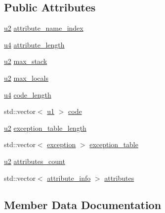 \subsection*{Public Attributes}
\begin{DoxyCompactItemize}
\item 
\hyperlink{types_8h_ae676e9207f57fb921dca7366b2f59c53}{u2} \hyperlink{structCode__attribute_ad268ff5454f5b4cf9d6e158f28a00e3f}{attribute\+\_\+name\+\_\+index}
\item 
\hyperlink{types_8h_af3b2d4b29fd9faedc984db3e062b3d5d}{u4} \hyperlink{structCode__attribute_a30b8294635789d4c5cd087670be6cee9}{attribute\+\_\+length}
\item 
\hyperlink{types_8h_ae676e9207f57fb921dca7366b2f59c53}{u2} \hyperlink{structCode__attribute_a300885ff1326f01f7c86e7b4425f0d35}{max\+\_\+stack}
\item 
\hyperlink{types_8h_ae676e9207f57fb921dca7366b2f59c53}{u2} \hyperlink{structCode__attribute_ad710ec86a1d37c6daa999383f8f2fd35}{max\+\_\+locals}
\item 
\hyperlink{types_8h_af3b2d4b29fd9faedc984db3e062b3d5d}{u4} \hyperlink{structCode__attribute_a80af47e824a13ef4dc604e5b8671f793}{code\+\_\+length}
\item 
std\+::vector$<$ \hyperlink{types_8h_a162f47a77ee24f6f77cd8c82ccd40ab7}{u1} $>$ \hyperlink{structCode__attribute_a378524ef3cda8e293c4db96b66bb4745}{code}
\item 
\hyperlink{types_8h_ae676e9207f57fb921dca7366b2f59c53}{u2} \hyperlink{structCode__attribute_a24b063ad994d77688db7468fae11e7aa}{exception\+\_\+table\+\_\+length}
\item 
std\+::vector$<$ \hyperlink{structCode__attribute_1_1exception}{exception} $>$ \hyperlink{structCode__attribute_a448b86bad9c1f99e3792dbcbbb49be5d}{exception\+\_\+table}
\item 
\hyperlink{types_8h_ae676e9207f57fb921dca7366b2f59c53}{u2} \hyperlink{structCode__attribute_a9ca1435aa65ae02d764ff53a36fb842f}{attributes\+\_\+count}
\item 
std\+::vector$<$ \hyperlink{structattribute__info}{attribute\+\_\+info} $>$ \hyperlink{structCode__attribute_ab48e9f90b190463567fcc86737cbc5d2}{attributes}
\end{DoxyCompactItemize}


\subsection{Member Data Documentation}
\mbox{\label{structCode__attribute_a30b8294635789d4c5cd087670be6cee9}} 
